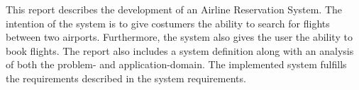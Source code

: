 This report describes the development of an Airline Reservation System. The intention of the system is to give costumers the ability to search for flights between two airports. Furthermore, the system also gives the user the ability to book flights. The report also includes a system definition along with an analysis of both the problem- and application-domain. The implemented system fulfills the requirements described in the system requirements.